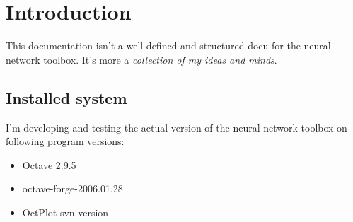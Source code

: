 \chapter{Introduction}
This documentation isn't a well defined and structured docu for the neural network toolbox.
It's more a \textit{collection of my ideas and minds}.

\section{Installed system}
I'm developing and testing the actual version of the neural network toolbox on following 
program versions:

\begin{itemize}
  \item Octave 2.9.5
  \item octave-forge-2006.01.28
  \item OctPlot svn version
\end{itemize}





%

